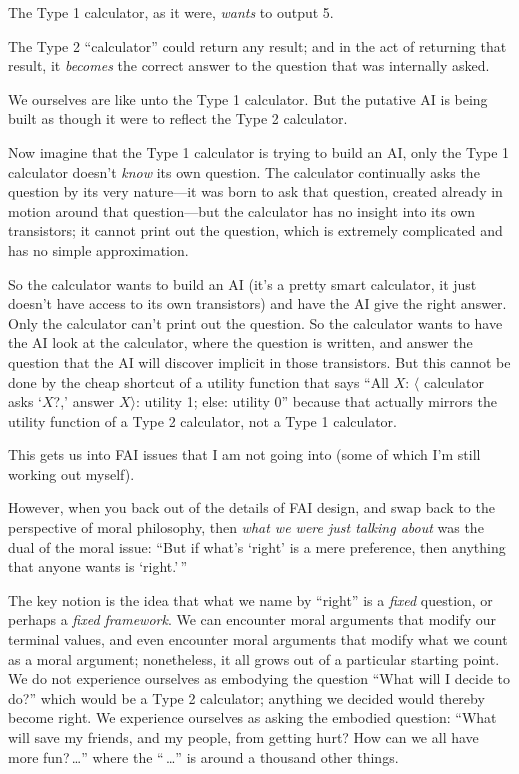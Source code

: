  The Type 1 calculator, as it were, \textit{wants} to output 5.


 The Type 2 ``calculator'' could
return any result; and in the act of returning that result, it
\textit{becomes} the correct answer to the question that was internally
asked.


 We ourselves are like unto the Type 1 calculator. But the putative
AI is being built as though it were to reflect the Type 2 calculator.


 Now imagine that the Type 1 calculator is trying to build an AI,
only the Type 1 calculator doesn't \textit{know} its
own question. The calculator continually asks the question by its very
nature---it was born to ask that question, created already in motion
around that question---but the calculator has no insight into its own
transistors; it cannot print out the question, which is extremely
complicated and has no simple approximation.


 So the calculator wants to build an AI (it's a
pretty smart calculator, it just doesn't have access to
its own transistors) and have the AI give the right answer. Only the
calculator can't print out the question. So the
calculator wants to have the AI look at the calculator, where the
question is written, and answer the question that the AI will discover
implicit in those transistors. But this cannot be done by the cheap
shortcut of a utility function that says ``All $X$:
$\langle$ calculator asks
`$X$?,' answer
$X$$\rangle$: utility 1; else: utility
0'' because that actually mirrors the utility
function of a Type 2 calculator, not a Type 1 calculator.


 This gets us into FAI issues that I am not going into (some of
which I'm still working out myself).


 However, when you back out of the details of FAI design, and swap
back to the perspective of moral philosophy, then \textit{what we were
just talking about} was the dual of the moral issue:
``But if what's
`right' is a mere preference, then
anything that anyone wants is
`right.'\,''


 The key notion is the idea that what we name by
``right'' is a \textit{fixed}
question, or perhaps a \textit{fixed framework}. We can encounter moral
arguments that modify our terminal values, and even encounter moral
arguments that modify what we count as a moral argument; nonetheless,
it all grows out of a particular starting point. We do not experience
ourselves as embodying the question ``What will I
decide to do?'' which would be a Type 2 calculator;
anything we decided would thereby become right. We experience ourselves
as asking the embodied question: ``What will save my
friends, and my people, from getting hurt? How can we all have more
fun?\,\ldots'' where the
``\,\ldots'' is around a thousand other
things.



